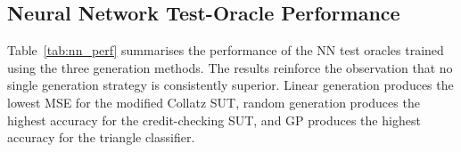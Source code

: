 \documentclass[runningheads]{llncs}
\begin{document}




\subsection{Neural Network  Test-Oracle Performance}\label{sub:oracle}
Table~\ref{tab:nn_perf} summarises the performance of the NN test oracles trained using the three generation methods. The results reinforce the observation that no single generation strategy is consistently superior. Linear generation produces the lowest MSE for the modified Collatz SUT, random generation produces the highest accuracy for the credit-checking SUT, and GP produces the highest accuracy for the triangle classifier.
\end{document}
